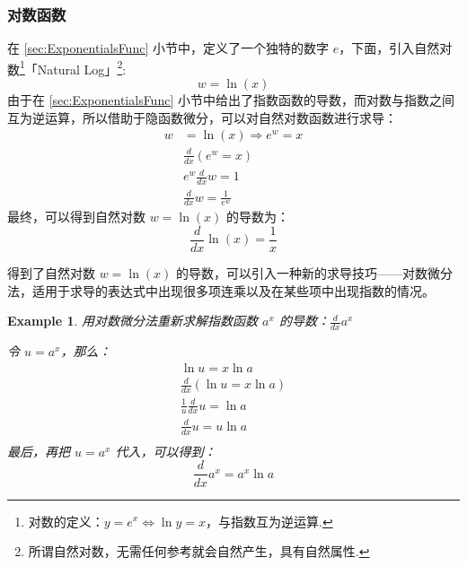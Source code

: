 \documentclass{ctexart}
\numberwithin{equation}{section}
\numberwithin{figure}{section}
\newtheorem{myEx}{Example}[section] %
\begin{document}
\subsubsection{对数函数}

在 \ref{sec:ExponentialsFunc} 小节中，定义了一个独特的数字 \(e\)，下面，引入自然对数\footnote{对数的定义：\(y=e^{x}\Leftrightarrow \ln y =x\)，与指数互为逆运算.}「Natural Log」\footnote{所谓自然对数，无需任何参考就会自然产生，具有自然属性.}:
\begin{equation}
    w = \ln (x)
\end{equation}
由于在 \ref{sec:ExponentialsFunc} 小节中给出了指数函数的导数，而对数与指数之间互为逆运算，所以借助于隐函数微分，可以对自然对数函数进行求导：
\begin{align*}
    w & = \ln (x)  \Rightarrow e^{w}  = x   \\
      & \frac{d}{dx}\left(e^{w}  = x\right) \\
      & e^{w}\frac{d}{dx}w = 1              \\
      & \frac{d}{dx}w = \frac{1}{e^{w}}
\end{align*}
最终，可以得到自然对数 \(w = \ln (x)\) 的导数为：
\begin{equation}
    \frac{d}{dx}\ln (x) = \frac{1}{x}
\end{equation}

得到了自然对数 \(w = \ln (x)\) 的导数，可以引入一种新的求导技巧——对数微分法，适用于求导的表达式中出现很多项连乘以及在某些项中出现指数的情况。

\begin{myEx}
    用对数微分法重新求解指数函数 \(a^{x}\) 的导数：\(\frac{d}{dx}a^{x}\)

    令 \(u = a^{x}\)，那么：
    \begin{align*}
        \ln u = x \ln a                          \\
        \frac{d}{dx}\left(\ln u = x \ln a\right) \\
        \frac{1}{u}\frac{d}{dx}u = \ln a         \\
        \frac{d}{dx}u  = u \ln a                 \\
    \end{align*}
    最后，再把 \(u = a^{x}\) 代入，可以得到：
    \begin{equation*}
        \frac{d}{dx}a^{x}  = a^{x} \ln a
    \end{equation*}
\end{myEx}
\end{document}
